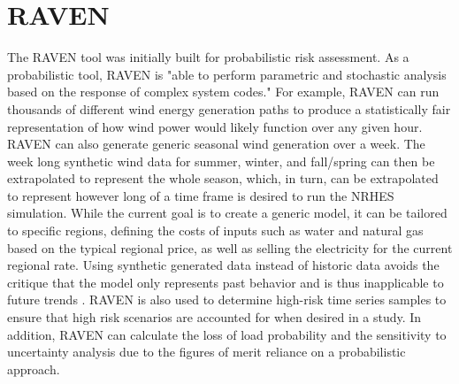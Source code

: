\documentclass[12pt]{UIdahoMastersThesis}
\begin{document}
\section{RAVEN}
The RAVEN tool was initially built for probabilistic risk assessment. As a probabilistic tool, RAVEN is "able to perform parametric and stochastic analysis based on the response of complex system codes\cite{RabitiRAVEN}." For example, RAVEN can run thousands of different wind energy generation paths to produce a statistically fair representation of how wind power would likely function over any given hour. RAVEN can also generate generic seasonal wind generation over a week. The week long synthetic wind data for summer, winter, and fall/spring can then be extrapolated to represent the whole season, which, in turn, can be extrapolated to represent however long of a time frame is desired to run the NRHES simulation. While the current goal is to create a generic model, it can be tailored to specific regions, defining the costs of inputs such as water and natural gas based on the typical regional price, as well as selling the electricity for the current regional rate. Using synthetic generated data instead of historic data avoids the critique that the model only represents past behavior and is thus inapplicable to future trends \cite{redfoot_epiney_2016}. RAVEN is also used to determine high-risk time series samples to ensure that high risk scenarios are accounted for when desired in a study. In addition, RAVEN can calculate the loss of load probability and the sensitivity to uncertainty analysis due to the figures of merit reliance on a probabilistic approach. 
\end{document}
